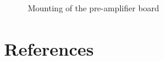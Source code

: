 \documentclass[a4paper]{article}
\begin{document}
\begin{appendices}
\begin{figure}[ht!]
\centering
{}
\caption{Mounting of the pre-amplifier board}
\end{figure}

\end{appendices}


\clearpage
\section{References}
\printbibliography
\end{document}
